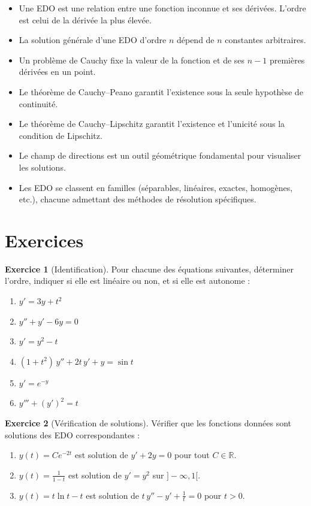 \documentclass[12pt,a4paper,openany]{book}
\theoremstyle{definition}
\newtheorem{exercice}{Exercice}[chapter]
\theoremstyle{plain}
\theoremstyle{remark}
\newcommand{\R}{\mathbb{R}}
\begin{document}
\begin{tcolorbox}[colback=blue!3,colframe=blue!50!black,title={\textbf{Résumé --- Chapitre 1}}]
\begin{itemize}[leftmargin=*]
\item Une EDO est une relation entre une fonction inconnue et ses dérivées. L'ordre est celui de la dérivée la plus élevée.
\item La solution générale d'une EDO d'ordre $n$ dépend de $n$ constantes arbitraires.
\item Un problème de Cauchy fixe la valeur de la fonction et de ses $n-1$ premières dérivées en un point.
\item Le théorème de Cauchy--Peano garantit l'existence sous la seule hypothèse de continuité.
\item Le théorème de Cauchy--Lipschitz garantit l'existence et l'unicité sous la condition de Lipschitz.
\item Le champ de directions est un outil géométrique fondamental pour visualiser les solutions.
\item Les EDO se classent en familles (séparables, linéaires, exactes, homogènes, etc.), chacune admettant des méthodes de résolution spécifiques.
\end{itemize}
\end{tcolorbox}

\section{Exercices}
\label{sec:exercices-ch1}

\begin{exercice}[Identification]
\label{exo:ch1-identification}
Pour chacune des équations suivantes, déterminer l'ordre, indiquer si elle est linéaire ou non, et si elle est autonome :
\begin{enumerate}[label=(\alph*)]
\item $y' = 3y + t^2$
\item $y'' + y' - 6y = 0$
\item $y' = y^2 - t$
\item $(1+t^2)\,y'' + 2t\,y' + y = \sin t$
\item $y' = e^{-y}$
\item $y''' + (y')^2 = t$
\end{enumerate}
\end{exercice}

\begin{exercice}[Vérification de solutions]
\label{exo:ch1-verification}
Vérifier que les fonctions données sont solutions des EDO correspondantes :
\begin{enumerate}[label=(\alph*)]
\item $y(t) = Ce^{-2t}$ est solution de $y' + 2y = 0$ pour tout $C \in \R$.
\item $y(t) = \frac{1}{1-t}$ est solution de $y' = y^2$ sur $]-\infty, 1[$.
\item $y(t) = t\ln t - t$ est solution de $t\,y'' - y' + \frac{1}{t} = 0$ pour $t > 0$.
\end{enumerate}
\end{exercice}
\end{document}
